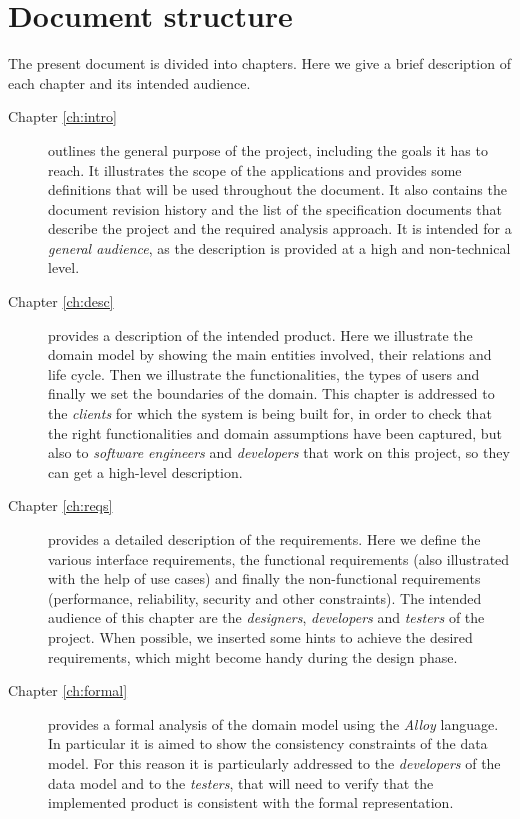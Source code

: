 \section{Document structure}
The present document is divided into chapters. Here we give a brief description
of each chapter and its intended audience.
\begin{description}
    \item[Chapter \ref{ch:intro}] outlines the general purpose of the project,
    including the goals it has to reach. It illustrates the scope of the
    applications and provides some definitions that will be used throughout
    the document. It also contains the document revision history and the list of
    the specification documents that describe the project and the required
    analysis approach.
    It is intended for a \emph{general audience}, as the description is provided
    at a high and non-technical level.
    \item[Chapter \ref{ch:desc}] provides a description of the intended product.
    Here we illustrate the domain model by showing the main entities involved,
    their relations and life cycle.
    Then we illustrate the functionalities, the types of users and finally we
    set the boundaries of the domain.
    This chapter is addressed to the \emph{clients} for which the system is
    being built for, in order to check that the right functionalities and domain
    assumptions have been captured, but also to \emph{software engineers}
    and \emph{developers} that work on this project, so they can get a
    high-level description.
    \item[Chapter \ref{ch:reqs}] provides a detailed description of the
    requirements.
    Here we define the various interface requirements, the functional
    requirements (also illustrated with the help of use cases) and
    finally the non-functional requirements (performance, reliability, security
    and other constraints).
    The intended audience of this chapter are the \emph{designers},
    \emph{developers} and \emph{testers} of the project.
    When possible, we inserted some hints to achieve the desired requirements,
    which might become handy during the design phase.
    \item[Chapter \ref{ch:formal}] provides a formal analysis of the domain
    model using the \emph{Alloy} language.
    In particular it is aimed to show the consistency constraints of the data
    model.
    For this reason it is particularly addressed to the \emph{developers} of the
    data model and to the \emph{testers}, that will need to verify that the
    implemented product is consistent with the formal representation. 
\end{description}